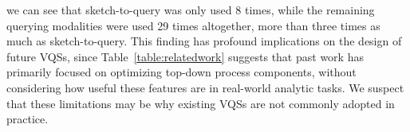  we can see that sketch-to-query was only used
 8 times, while the remaining querying modalities were used 29 times altogether,
 more than three times as much as sketch-to-query.
 This finding has profound implications
 on the design of future VQSs, since Table~\ref{table:relatedwork}
 suggests that past work has primarily focused
 on optimizing top-down process components,
 without considering how useful these features
 are in real-world analytic tasks.
 We suspect that these limitations
 may be why existing VQSs are not commonly adopted in practice. 

 
